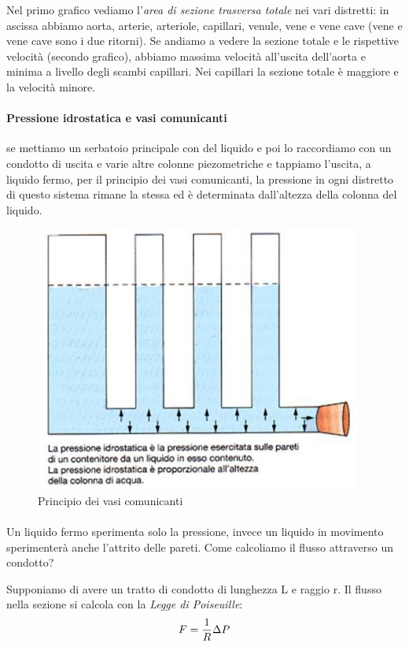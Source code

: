 \documentclass[a4paper,12pt]{article}
\begin{document}
Nel primo grafico vediamo l'\emph{area di sezione trasversa totale} nei vari distretti: in ascissa abbiamo aorta, arterie, arteriole, capillari, venule, vene e vene cave (vene e vene cave sono i due ritorni). Se andiamo a vedere la sezione totale e le rispettive velocità (secondo grafico), abbiamo massima velocità all'uscita dell'aorta e minima a livello degli scambi capillari. Nei capillari la sezione totale è maggiore e la velocità minore.


\paragraph{Pressione idrostatica e vasi comunicanti} se mettiamo un serbatoio principale con del liquido e poi lo raccordiamo con un condotto di uscita e varie altre colonne piezometriche e tappiamo l'uscita, a liquido fermo, per il principio dei vasi comunicanti, la pressione in ogni distretto di questo sistema rimane la stessa ed è determinata dall'altezza della colonna del liquido.

\begin{figure}[H]
\centering
\includegraphics[scale=0.4]{immagine/pressione.jpg}
\caption{Principio dei vasi comunicanti}
\end{figure}

\paragraph{}
Un liquido fermo sperimenta solo la pressione, invece un liquido in movimento sperimenterà anche l'attrito delle pareti. Come calcoliamo il flusso attraverso un condotto?

Supponiamo di avere un tratto di condotto di lunghezza L e raggio r. Il flusso nella sezione si calcola con la \emph{Legge di Poiseuille}:
\begin{equation}
\centering
F=\frac{1}{R} \Delta P
\end{equation}
\end{document}
